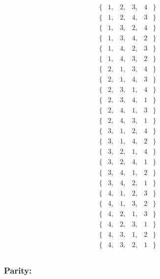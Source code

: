 \documentclass[a4paper,11pt,twoside]{report}
\begin{document}
	\[\begin{matrix}
		\{ & 1, & 2, & 3, & 4 & \} \\
		\{ & 1, & 2, & 4, & 3 & \} \\
		\{ & 1, & 3, & 2, & 4 & \} \\
		\{ & 1, & 3, & 4, & 2 & \} \\
		\{ & 1, & 4, & 2, & 3 & \} \\
		\{ & 1, & 4, & 3, & 2 & \} \\

		\{ & 2, & 1, & 3, & 4 & \} \\
		\{ & 2, & 1, & 4, & 3 & \} \\
		\{ & 2, & 3, & 1, & 4 & \} \\
		\{ & 2, & 3, & 4, & 1 & \} \\
		\{ & 2, & 4, & 1, & 3 & \} \\
		\{ & 2, & 4, & 3, & 1 & \} \\


		\{ & 3, & 1, & 2, & 4 & \} \\
		\{ & 3, & 1, & 4, & 2 & \} \\
		\{ & 3, & 2, & 1, & 4 & \} \\
		\{ & 3, & 2, & 4, & 1 & \} \\
		\{ & 3, & 4, & 1, & 2 & \} \\
		\{ & 3, & 4, & 2, & 1 & \} \\

		\{ & 4, & 1, & 2, & 3 & \} \\
		\{ & 4, & 1, & 3, & 2 & \} \\
		\{ & 4, & 2, & 1, & 3 & \} \\
		\{ & 4, & 2, & 3, & 1 & \} \\
		\{ & 4, & 3, & 1, & 2 & \} \\
		\{ & 4, & 3, & 2, & 1 & \} \\
\end{matrix} \]

\subsubsection{Parity:}%
\label{ssub:parity_}
\end{document}

